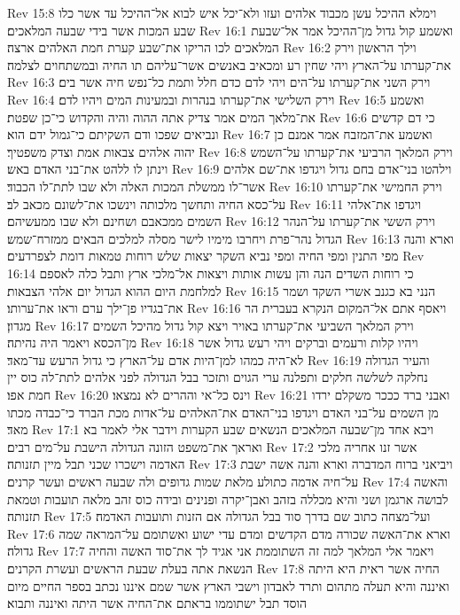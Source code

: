 Rev 15:8  וימלא ההיכל עשן מכבוד אלהים ועזו ולא־יכל איש לבוא אל־ההיכל עד אשר כלו שבע המכות אשר בידי שבעה המלאכים׃
Rev 16:1  ואשמע קול גדול מן־ההיכל אמר אל־שבעת המלאכים לכו הריקו את־שבע קערת חמת האלהים ארצה׃
Rev 16:2  וילך הראשון וירק את־קערתו על־הארץ ויהי שחין רע ומכאיב באנשים אשר־עליהם תו החיה ובמשתחוים לצלמה׃
Rev 16:3  וירק השני את־קערתו על־הים ויהי לדם כדם חלל ותמת כל־נפש חיה אשר בים׃
Rev 16:4  וירק השלישי את־קערתו בנהרות ובמעינות המים ויהיו לדם׃
Rev 16:5  ואשמע את־מלאך המים אמר צדיק אתה ההוה והיה והקדוש כי־כן שפטת׃
Rev 16:6  כי דם קדשים ונביאים שפכו ודם השקיתם כי־גמול ידם הוא׃
Rev 16:7  ואשמע את־המזבח אמר אמנם כן יהוה אלהים צבאות אמת וצדק משפטיך׃
Rev 16:8  וירק המלאך הרביעי את־קערתו על־השמש וינתן לו ללהט את־בני האדם באש׃
Rev 16:9  וילהטו בני־אדם בחם גדול ויגדפו את־שם אלהים אשר־לו ממשלת המכות האלה ולא שבו לתת־לו הכבוד׃
Rev 16:10  וירק החמישי את־קערתו על־כסא החיה ותחשך מלכותה וינשכו את־לשונם מכאב לב׃
Rev 16:11  ויגדפו את־אלהי השמים ממכאבם ושחינם ולא שבו ממעשיהם׃
Rev 16:12  וירק הששי את־קערתו על־הנהר הגדול נהר־פרת ויחרבו מימיו לישר מסלה למלכים הבאים ממזרח־שמש׃
Rev 16:13  וארא והנה מפי התנין ומפי החיה ומפי נביא השקר יצאות שלש רוחות טמאות דומת לצפרדעים׃
Rev 16:14  כי רוחות השדים הנה והן עשות אותות ויצאות אל־מלכי ארץ ותבל כלה לאספם למלחמת היום ההוא הגדול יום אלהי הצבאות׃
Rev 16:15  הנני בא כגנב אשרי השקד ושמר את־בגדיו פן־ילך ערם וראו את־ערותו׃
Rev 16:16  ויאסף אתם אל־המקום הנקרא בעברית הר מגדון׃
Rev 16:17  וירק המלאך השביעי את־קערתו באויר ויצא קול גדול מהיכל השמים מן־הכסא ויאמר היה נהיתה׃
Rev 16:18  ויהיו קלות ורעמים וברקים ויהי רעש גדול אשר לא־היה כמהו למן־היות אדם על־הארץ כי גדול הרעש עד־מאד׃
Rev 16:19  והעיר הגדולה נחלקה לשלשה חלקים ותפלנה ערי הגוים ותזכר בבל הגדולה לפני אלהים לתת־לה כוס יין חמת אפו׃
Rev 16:20  וינס כל־אי וההרים לא נמצאו׃
Rev 16:21  ואבני ברד כככר משקלם ירדו מן השמים על־בני האדם ויגדפו בני־האדם את־האלהים על־אדות מכת הברד כי־כבדה מכתו מאד׃
Rev 17:1  ויבא אחד מן־שבעה המלאכים הנשאים שבע הקערות וידבר אלי לאמר בא ואראך את־משפט הזונה הגדולה הישבת על־מים רבים׃
Rev 17:2  אשר זנו אחריה מלכי האדמה וישכרו שכני תבל מיין תזנותה׃
Rev 17:3  ויביאני ברוח המדברה וארא והנה אשה ישבת על־חיה אדמה כתולע מלאת שמות גדופים ולה שבעה ראשים ועשר קרנים׃
Rev 17:4  והאשה לבושה ארגמן ושני והיא מכללה בזהב ואבן־יקרה ופנינים ובידה כוס זהב מלאה תועבות וטמאת תזנותה׃
Rev 17:5  ועל־מצחה כתוב שם בדרך סוד בבל הגדולה אם הזנות ותועבות האדמה׃
Rev 17:6  וארא את־האשה שכורה מדם הקדשים ומדם עדי ישוע ואשתומם על־המראה שמה גדולה׃
Rev 17:7  ויאמר אלי המלאך למה זה השתוממת אני אגיד לך את־סוד האשה והחיה הנשאת אתה בעלת שבעת הראשים ועשרת הקרנים׃
Rev 17:8  החיה אשר ראית היא היתה ואיננה והיא תעלה מתהום ותרד לאבדון וישבי הארץ אשר שמם איננו נכתב בספר החיים מיום הוסד תבל ישתוממו בראתם את־החיה אשר היתה ואיננה ותבוא׃
